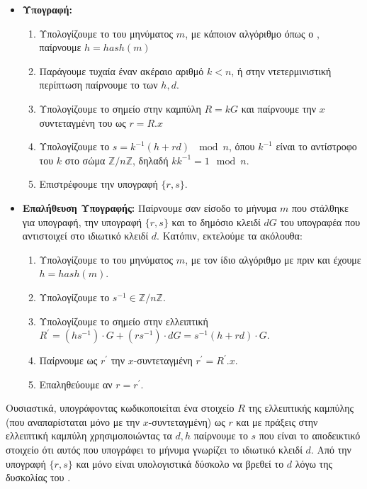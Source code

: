 \documentclass[oneside,a4paper]{article}
\begin{document}
\vspace*{0.3cm}
\begin{itemize}
	\item \textbf{Υπογραφή:}
	\begin{enumerate}
		\item Υπολογίζουμε το  του μηνύματος $m$, με κάποιον  αλγόριθμο όπως ο , παίρνουμε $h=hash(m)$
		\item Παράγουμε τυχαία έναν ακέραιο αριθμό $k < n$, ή στην ντετερμινιστική περίπτωση παίρνουμε το  των $h,d$.
		\item Υπολογίζουμε το σημείο στην καμπύλη $R = kG$ και παίρνουμε την $x$ συντεταγμένη του ως $r = R.x$
		\item Υπολογίζουμε το $s = k^{-1} (h+rd) \ \mod n$, όπου $k^{-1}$ είναι το αντίστροφο του $k$ στο σώμα $\mathbb{Z}/n\mathbb{Z}$, δηλαδή $k k^{-1} = 1 \mod n$.
		\item Επιστρέφουμε την υπογραφή $\{r,s\}$.
	\end{enumerate}
	\item \textbf{Επαλήθευση Υπογραφής:}
	Παίρνουμε σαν είσοδο το μήνυμα $m$ που στάλθηκε για υπογραφή, την υπογραφή $\{r,s\}$ και το δημόσιο κλειδί $dG$ του υπογραφέα που αντιστοιχεί στο ιδιωτικό κλειδί $d$. Κατόπιν, εκτελούμε τα ακόλουθα:
	\begin{enumerate}
		\item Υπολογίζουμε το  του μηνύματος $m$, με τον ίδιο αλγόριθμο με πριν και έχουμε $h=hash(m)$.
		\item Υπολογίζουμε το $s^{-1} \in \mathbb{Z}/n \mathbb{Z}$.
		\item Υπολογίζουμε το σημείο στην ελλειπτική $R^{\prime} = (h s^{-1})\cdot G + (r s^{-1})\cdot dG = s^{-1}(h+rd) \cdot G$.
		\item Παίρνουμε ως $r^{\prime}$ την $x$-συντεταγμένη $r^{\prime} = R^{\prime}.x$.
		\item Επαληθεύουμε αν $r=r^{\prime}$.
	\end{enumerate}
\end{itemize}

Ουσιαστικά, υπογράφοντας κωδικοποιείται ένα στοιχείο $R$ της ελλειπτικής καμπύλης (που αναπαρίσταται μόνο με την $x$-συντεταγμένη) ως $r$ και με πράξεις στην ελλειπτική καμπύλη χρησιμοποιώντας τα $d,h$ παίρνουμε το $s$ που είναι το αποδεικτικό στοιχείο ότι αυτός που υπογράφει το μήνυμα γνωρίζει το ιδιωτικό κλειδί $d$. Από την υπογραφή $\{r,s\}$ και μόνο είναι υπολογιστικά δύσκολο να βρεθεί το $d$ λόγω της δυσκολίας του .
\end{document}
